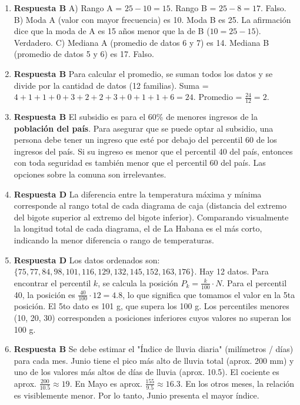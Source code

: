 \documentclass[11pt]{article}
\begin{document}
\begin{enumerate}
    \item \textbf{Respuesta B} A) Rango A = $25-10=15$. Rango B = $25-8=17$. Falso. B) Moda A (valor con mayor frecuencia) es 10. Moda B es 25. La afirmación dice que la moda de A es 15 años menor que la de B ($10 = 25 - 15$). Verdadero. C) Mediana A (promedio de datos 6 y 7) es 14. Mediana B (promedio de datos 5 y 6) es 17. Falso. %

    \item \textbf{Respuesta B} Para calcular el promedio, se suman todos los datos y se divide por la cantidad de datos (12 familias). Suma = $4+1+1+0+3+2+2+3+0+1+1+6 = 24$. Promedio = $\frac{24}{12} = 2$. %

    \item \textbf{Respuesta B} El subsidio es para el 60\% de menores ingresos de la \textbf{población del país}. Para asegurar que se puede optar al subsidio, una persona debe tener un ingreso que esté por debajo del percentil 60 de los ingresos del país. Si su ingreso es menor que el percentil 40 del país, entonces con toda seguridad es también menor que el percentil 60 del país. Las opciones sobre la comuna son irrelevantes. %
    
    \item \textbf{Respuesta D} La diferencia entre la temperatura máxima y mínima corresponde al rango total de cada diagrama de caja (distancia del extremo del bigote superior al extremo del bigote inferior). Comparando visualmente la longitud total de cada diagrama, el de La Habana es el más corto, indicando la menor diferencia o rango de temperaturas. %

    \item \textbf{Respuesta D} Los datos ordenados son: $\{75, 77, 84, 98, 101, 116, 129, 132, 145, 152, 163, 176\}$. Hay 12 datos. Para encontrar el percentil $k$, se calcula la posición $P_k = \frac{k}{100} \cdot N$. Para el percentil 40, la posición es $\frac{40}{100} \cdot 12 = 4.8$, lo que significa que tomamos el valor en la 5ta posición. El 5to dato es 101 g, que supera los 100 g. Los percentiles menores (10, 20, 30) corresponden a posiciones inferiores cuyos valores no superan los 100 g. %
    
    \item \textbf{Respuesta B} Se debe estimar el "Índice de lluvia diaria" (milímetros / días) para cada mes. Junio tiene el pico más alto de lluvia total (aprox. 200 mm) y uno de los valores más altos de días de lluvia (aprox. 10.5). El cociente es aprox. $\frac{200}{10.5} \approx 19$. En Mayo es aprox. $\frac{155}{9.5} \approx 16.3$. En los otros meses, la relación es visiblemente menor. Por lo tanto, Junio presenta el mayor índice. %


\end{enumerate}
\end{document}
